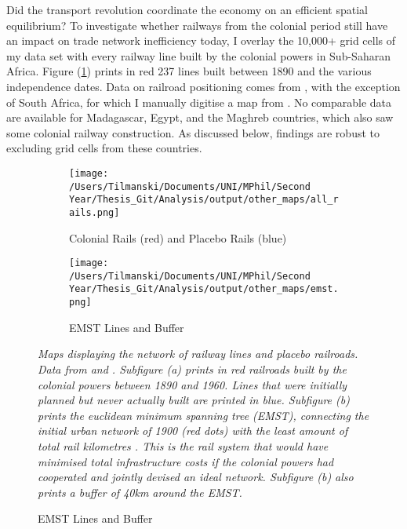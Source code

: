 \documentclass[11pt, oneside]{article}   	%
\let\oldref\ref
\renewcommand{\ref}[1]{(\oldref{#1})}
\newcommand{\mysubcaption}[1]{
\justify
\begin{spacing}{0.7}
\textit{\footnotesize #1}
\end{spacing}}
\begin{document}
Did the transport revolution coordinate the economy on an efficient spatial equilibrium? To investigate whether railways from the colonial period still have an impact on trade network inefficiency today, I overlay the 10,000+ grid cells of my data set with every railway line built by the colonial powers in Sub-Saharan Africa. Figure \ref{fig:Railroad_Map} prints in red 237 lines built between 1890 and the various independence dates. Data on railroad positioning comes from \cite{jedwab_permanent_2016}, with the exception of South Africa, for which I manually digitise a map from \cite{Herranz-Loncan_publicbenefitRailways_2017}. No comparable data are available for Madagascar, Egypt, and the Maghreb countries, which also saw some colonial railway construction. As discussed below, findings are robust to excluding grid cells from these countries.

\begin{figure}
\centering
\caption{Colonial Railway Network}

\begin{subfigure}[c]{0.48\textwidth}
\texttt{[image: /Users/Tilmanski/Documents/UNI/MPhil/Second Year/Thesis\_Git/Analysis/output/other\_maps/all\_rails.png]}
\caption{Colonial Rails (red) and Placebo Rails (blue)}
\label{fig:Railroad_Map}
\end{subfigure}
\begin{subfigure}[c]{0.48\textwidth}
\texttt{[image: /Users/Tilmanski/Documents/UNI/MPhil/Second Year/Thesis\_Git/Analysis/output/other\_maps/emst.png]}
\caption{EMST Lines and Buffer}
\label{fig:EMST_Map}
\end{subfigure}

\label{fig:Rail Maps}
\mysubcaption{Maps displaying the network of railway lines and placebo railroads. Data from \cite{jedwab_permanent_2016} and \cite{Herranz-Loncan_publicbenefitRailways_2017}. Subfigure (a) prints in red  railroads built by the colonial powers between 1890 and 1960. Lines that were initially planned but never actually built are printed in blue. Subfigure (b) prints the euclidean minimum spanning tree (EMST), connecting the initial urban network of 1900 (red dots) with the least amount of total rail kilometres \citep[see ][]{jedwab_permanent_2016}. This is the rail system that would have minimised total infrastructure costs if the colonial powers had cooperated and jointly devised an ideal network. Subfigure (b) also prints a buffer of 40km around the EMST.}
\end{figure}
\end{document}
